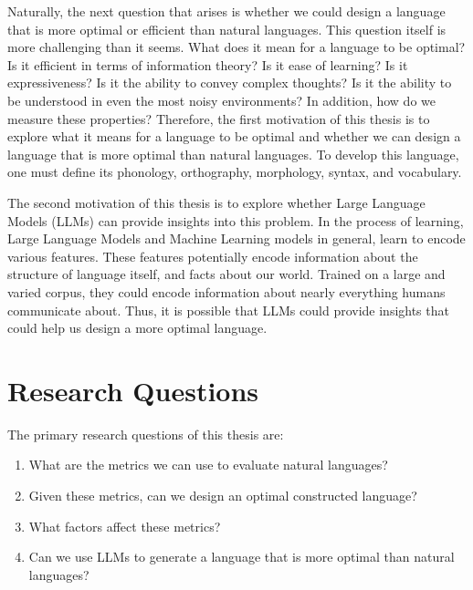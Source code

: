 Naturally, the next question that arises is whether we could design a language that is more optimal or efficient than natural languages.
This question itself is more challenging than it seems. What does it mean for a language to be optimal? Is it efficient in terms of information theory?
Is it ease of learning? Is it expressiveness? Is it the ability to convey complex thoughts? Is it the ability to be understood in even the most 
noisy environments? In addition, how do we measure these properties? Therefore, the first motivation of this thesis is to explore what it means 
for a language to be optimal and whether we can design a language that is more optimal than natural languages. To develop this language, one 
must define its phonology, orthography, morphology, syntax, and vocabulary.

The second motivation of this thesis is to explore whether Large Language Models (LLMs) can provide insights into this problem. In the process 
of learning, Large Language Models and Machine Learning models in general, learn to encode various features. These features potentially encode
information about the structure of language itself, and facts about our world. Trained on a large and varied corpus, they could encode information
about nearly everything humans communicate about. Thus, it is possible that LLMs could provide insights that could help us design a more optimal language.

\section{Research Questions}
The primary research questions of this thesis are:
\begin{enumerate}
    \item What are the metrics we can use to evaluate natural languages? 
    \item Given these metrics, can we design an optimal constructed language?
    \item What factors affect these metrics?
    \item Can we use LLMs to generate a language that is more optimal than natural languages?
\end{enumerate}

